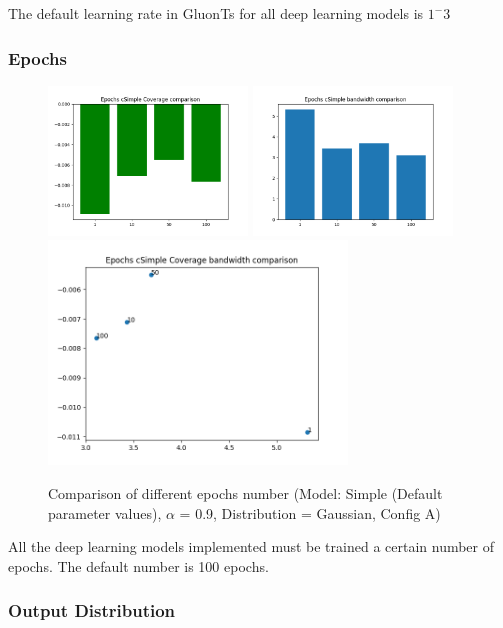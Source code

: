 \documentclass[a4paper, 12pt]{article}
\begin{document}
The default learning rate in GluonTs for all deep learning models is $1^-3$

\subsubsection{Epochs} \label{comp_epochs}

\begin{figure}[!h]
    \centering
    \includegraphics[width=200px]{plots/hist/a/epochs/cSimple/Coverage.png}
    \includegraphics[width=200px]{plots/hist/a/epochs/cSimple/bandwidth.png}
    \includegraphics[width=300px]{plots/scatter/a/epochs/cSimple/Coverage_bandwidth.png}
    \caption{Comparison of different epochs number (Model: Simple (Default parameter values), $\alpha$ = 0.9, Distribution = Gaussian, Config A)}
    \label{fig:comp_epochs}
\end{figure}

All the deep learning models implemented must be trained a certain number of epochs. The default number 
is 100 epochs. 

\subsubsection{Output Distribution} \label{comp_outdistrib}
\end{document}
